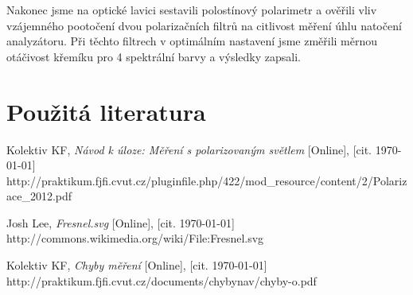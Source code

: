 \documentclass[english]{article}
\begin{document}
Nakonec jsme na optické lavici sestavili polostínový polarimetr a ověřili vliv vzájemného pootočení dvou polarizačních filtrů na citlivost měření úhlu natočení analyzátoru. Při těchto filtrech v optimálním nastavení jsme změřili měrnou otáčivost křemíku pro 4 spektrální barvy a výsledky zapsali.


\section {Použitá literatura}
\begingroup
\renewcommand{\section}[2]{}

\begin{thebibliography}{9}
 Kolektiv KF, \emph{Návod k úloze: Měření s polarizovaným světlem} [Online], [cit. \today] \newline http://praktikum.fjfi.cvut.cz/pluginfile.php/422/mod\_resource/content/2/Polarizace\_2012.pdf

 Josh Lee, \emph{Fresnel.svg} [Online], [cit. \today] \newline
http://commons.wikimedia.org/wiki/File:Fresnel.svg



 Kolektiv KF, \emph{Chyby měření} [Online], [cit. \today] \newline http://praktikum.fjfi.cvut.cz/documents/chybynav/chyby-o.pdf




\end{thebibliography}
\endgroup
\setcounter{equation}{0}
\end{document}

